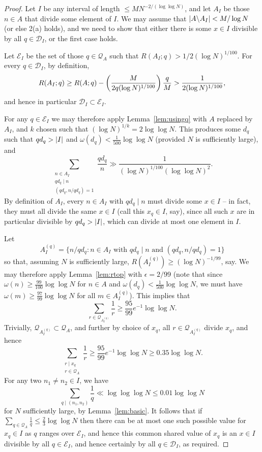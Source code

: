 \begin{proof}
Let $I$ be any interval of length $\leq MN^{-2/(\log\log N)}$, and let $A_I$ be those $n\in A$ that divide some element of $I$. We may assume that $\left\lvert A\backslash A_I\right\rvert< M/\log N$ (or else 2(a) holds), and we need to show that either there is some $x\in I$ divisible by all $q\in\mathcal{D}_I$, or the first case holds. 

Let $\mathcal{E}_I$ be the set of those $q\in\mathcal{Q}_A$ such that $R(A_I;q)> 1/2(\log N)^{1/100}$. For every $q\in \mathcal{D}_I$, by definition, 
\[R(A_I; q) \geq R(A;q) - \left( \frac{M}{2q(\log N)^{1/100}}\right)\frac{q}{M}>\frac{1}{2(\log N)^{1/100}},\]
and hence in particular $\mathcal{D}_I\subset \mathcal{E}_I$.

For any $q\in \mathcal{E}_I$ we may therefore apply Lemma~\ref{lem:usingq} with $A$ replaced by $A_I$, and $k$ chosen such that $(\log N)^{1/k}=2\log\log N$. This produces some $d_q$ such that $qd_q>\left\lvert I\right\rvert$ and $\omega(d_q)<\tfrac{1}{500}\log\log N$ (provided $N$ is sufficiently large), and
\[\sum_{\substack{n\in A_I\\ qd_q\mid n\\ (qd_q,n/qd_q)=1}}\frac{qd_q}{n}\gg \frac{1}{(\log N)^{1/100}(\log\log N)^2}.\]
By definition of $A_I$, every $n\in A_I$ with $qd_q\mid n$ must divide some $x\in I$ -- in fact, they must all divide the same $x\in I$ (call this $x_q\in I$, say), since all such $x$ are in particular divisible by $qd_q>\left\lvert I\right\rvert$, which can divide at most one element in $I$. 

Let 
\[A_I^{(q)}=\{ n/qd_q : n\in A_I\textrm{ with }qd_q\mid n\textrm{ and }(qd_q,n/qd_q)=1\}\]
so that, assuming $N$ is sufficiently large, $R(A_I^{(q)})\geq (\log N)^{-1/99}$, say. We may therefore apply Lemma~\ref{lem:rtop} with $\epsilon=2/99$ (note that since $\omega(n)\geq \frac{99}{100}\log\log N$ for $n\in A$ and $\omega(d_q)<\frac{1}{500}\log\log N$, we must have $\omega(m)\geq \frac{97}{99}\log\log N$ for all $m\in A_I^{(q)}$). This implies that 
\[\sum_{r\in \mathcal{Q}_{A_I^{(q)}}}\frac{1}{r}\geq \frac{95}{99}e^{-1}\log\log N.\]
Trivially, $\mathcal{Q}_{A_I^{(q)}}\subset \mathcal{Q}_A$, and further by choice of $x_q$, all $r\in \mathcal{Q}_{A_I^{(q)}}$ divide $x_q$, and hence 
\[\sum_{\substack{r\mid x_q\\ r\in \mathcal{Q}_A}}\frac{1}{r}\geq \frac{95}{99}e^{-1}\log\log N\geq 0.35\log\log N.\]
For any two $n_1\neq n_2\in I$, we have
\[\sum_{q\mid (n_1,n_2)}\frac{1}{q}\ll \log\log\log N\leq 0.01\log\log N\]
for $N$ sufficiently large, by Lemma~\ref{lem:basic}. It follows that if $\sum_{q\in\mathcal{Q}_A}\frac{1}{q}\leq \frac{2}{3}\log\log N$ then there can be at most one such possible value for $x_q\in I$ as $q$ ranges over $\mathcal{E}_I$, and hence this common shared value of $x_q$ is an $x\in I$ divisible by all $q\in\mathcal{E}_I$, and hence certainly by all $q\in\mathcal{D}_I$, as required.
 

\end{proof}
